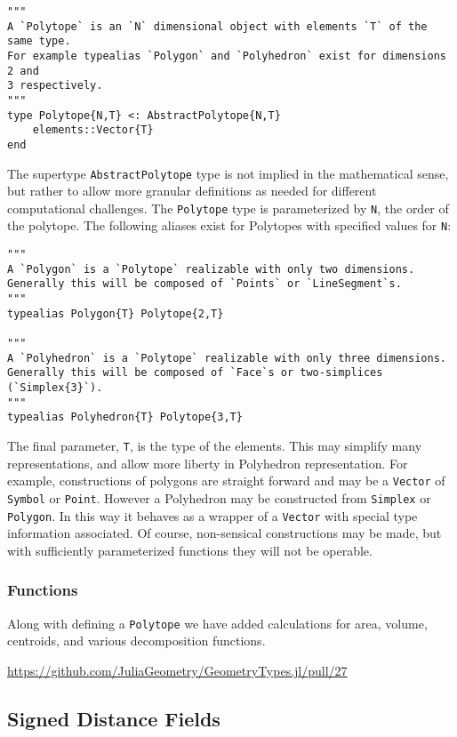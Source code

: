 \begin{lstlisting}
"""
A `Polytope` is an `N` dimensional object with elements `T` of the same type.
For example typealias `Polygon` and `Polyhedron` exist for dimensions 2 and
3 respectively.
"""
type Polytope{N,T} <: AbstractPolytope{N,T}
    elements::Vector{T}
end
\end{lstlisting}

The supertype \texttt{AbstractPolytope} type is not implied in the mathematical
sense, but rather to allow more granular definitions as needed for different
computational challenges. The \texttt{Polytope} type is parameterized
by \texttt{N}, the order of the polytope. The following
aliases exist for Polytopes with specified values for \texttt{N}:

\begin{lstlisting}
"""
A `Polygon` is a `Polytope` realizable with only two dimensions.
Generally this will be composed of `Points` or `LineSegment`s.
"""
typealias Polygon{T} Polytope{2,T}

"""
A `Polyhedron` is a `Polytope` realizable with only three dimensions.
Generally this will be composed of `Face`s or two-simplices (`Simplex{3}`).
"""
typealias Polyhedron{T} Polytope{3,T}
\end{lstlisting}

The final parameter, \texttt{T}, is the type of the elements. This may
simplify many representations, and allow more liberty in Polyhedron
representation. For example, constructions of polygons are straight forward
and may be a \texttt{Vector} of \texttt{Symbol} or \texttt{Point}.
However a Polyhedron may be constructed from \texttt{Simplex} or
\texttt{Polygon}. In this way it behaves as a wrapper of a \texttt{Vector}
with special type information associated. Of course, non-sensical constructions
may be made, but with sufficiently parameterized functions they will not
be operable.

\subsubsection{Functions}

Along with defining a \texttt{Polytope} we have added calculations for
area, volume, centroids, and various decomposition functions.

\url{https://github.com/JuliaGeometry/GeometryTypes.jl/pull/27}


\subsection{Signed Distance Fields}

